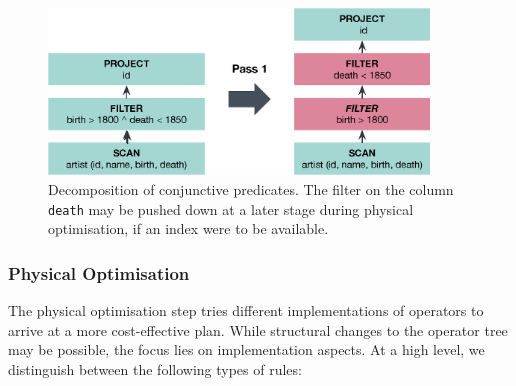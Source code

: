 \begin{figure}[bt]
    \centering
    \includegraphics[width=0.9\textwidth]{figures/logical-rule-conjunction}
    \caption{Decomposition of conjunctive predicates. The filter on the column \texttt{death} may be pushed down at a later stage during physical optimisation, if an index were to be available.}
    \label{figure:cottontail_logical_rule_conjunction}
\end{figure}

\subsubsection{Physical Optimisation}

The physical optimisation step tries different implementations of operators to arrive at a more cost-effective plan. While structural changes to the operator tree may be possible, the focus lies on implementation aspects.  At a high level, we distinguish between the following types of rules:

